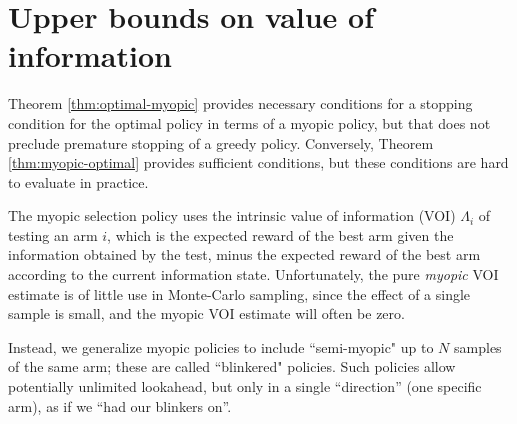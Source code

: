 \documentclass[]{article}
\begin{document}










\section{Upper bounds on value of information}\label{approx-nonbayesian-section}


Theorem \ref{thm:optimal-myopic} provides necessary conditions
for a stopping condition for the optimal policy in terms of a myopic
policy, but that does not preclude premature stopping of a greedy policy.
Conversely, Theorem \ref{thm:myopic-optimal} provides sufficient conditions, but these 
conditions are hard to evaluate in practice.

The myopic selection policy uses
the intrinsic value of information (VOI) $\Lambda_i$ of testing an arm $i$, which is
the expected reward of the best arm given the information obtained by the test,
minus the expected reward of the best arm according to the current information state.
Unfortunately, the pure \textit{myopic} VOI estimate is of little use in
Monte-Carlo sampling, since the effect of a single sample is small,
and the myopic VOI estimate will often be zero.

Instead, we generalize myopic policies to include ``semi-myopic"
up to $N$ samples of the same arm; these are called ``blinkered" policies.
Such policies allow potentially unlimited lookahead, but only in a single ``direction'' (one specific arm),
as if we ``had our blinkers on''.

\end{document}
